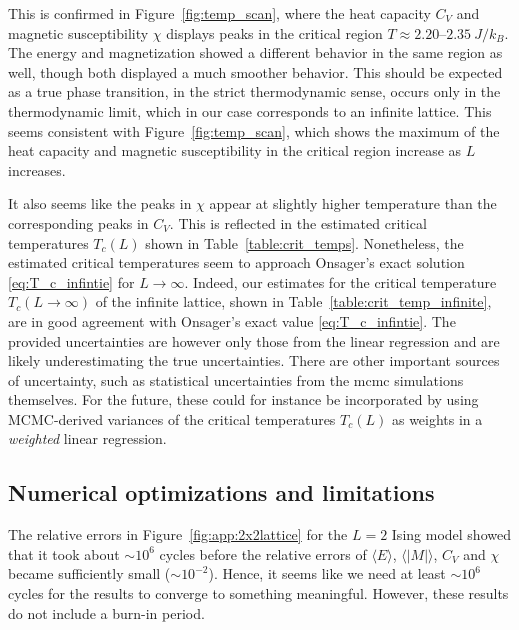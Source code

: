 \documentclass[english,notitlepage,reprint]{revtex4-2}  %
\begin{document}
This is confirmed in Figure~\ref{fig:temp_scan}, where the heat capacity \(C_V\) and magnetic susceptibility \(\chi\) displays peaks in the critical region \({T\approx2.20\text{--}2.35 \ \si{J/k_B}}\).
The energy and magnetization showed a different behavior in the same region as well, though both displayed a much smoother behavior.
This should be expected as a true phase transition, in the strict thermodynamic sense, occurs only in the thermodynamic limit, which in our case corresponds to an infinite lattice.
This seems consistent with Figure~\ref{fig:temp_scan}, which shows the maximum of the heat capacity and magnetic susceptibility in the critical region increase as \(L\) increases.

It also seems like the peaks in \(\chi\) appear at slightly higher temperature than the corresponding peaks in \(C_V\).
This is reflected in the estimated critical temperatures \(T_c(L)\) shown in Table~\ref{table:crit_temps}.
Nonetheless, the estimated critical temperatures seem to approach Onsager's exact solution \eqref{eq:T_c_infintie} for $L\rightarrow \infty$.
Indeed, our estimates for the critical temperature $T_c(L\rightarrow\infty)$ of the infinite lattice, shown in Table~\ref{table:crit_temp_infinite}, are in good agreement with Onsager's exact value \eqref{eq:T_c_infintie}.
The provided uncertainties are however only those from the linear regression and are likely underestimating the true uncertainties.
There are other important sources of uncertainty, such as statistical uncertainties from the \gls{mcmc} simulations themselves.
For the future, these could for instance be incorporated by using MCMC-derived variances of the critical temperatures \(T_c(L)\) as weights in a \textit{weighted} linear regression.

\subsection{Numerical optimizations and limitations}    \label{sec:numerics_discussion}
The relative errors in Figure~\ref{fig:app:2x2lattice} for the \(L=2\) Ising model showed that it took about \(\sim 10^6\) cycles before the relative errors of \(\langle E\rangle\), \(\langle |M|\rangle\), \(C_V\) and \(\chi\) became sufficiently small (\(\sim 10^{-2}\)). 
Hence, it seems like we need at least \(\sim 10^6\) cycles for the results to converge to something meaningful. 
However, these results do not include a burn-in period.
\end{document}
